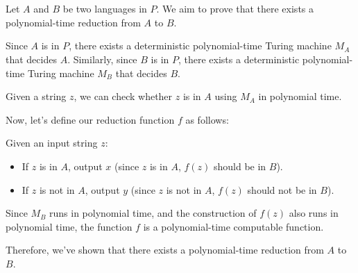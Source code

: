 \documentclass{article}
\begin{document}
\section{}
\begin{latin}
Let $A$ and $B$ be two languages in $P$. We aim to prove that there exists a polynomial-time reduction from $A$ to $B$. 

Since $A$ is in $P$, there exists a deterministic polynomial-time Turing machine $M_A$ that decides $A$. Similarly, since $B$ is in $P$, there exists a deterministic polynomial-time Turing machine $M_B$ that decides $B$.

Given a string $z$, we can check whether $z$ is in $A$ using $M_A$ in polynomial time.

Now, let's define our reduction function $f$ as follows:

Given an input string $z$:
\begin{itemize}
    \item If $z$ is in $A$, output $x$ (since $z$ is in $A$, $f(z)$ should be in $B$).
    \item If $z$ is not in $A$, output $y$ (since $z$ is not in $A$, $f(z)$ should not be in $B$).
\end{itemize}

Since $M_B$ runs in polynomial time, and the construction of $f(z)$ also runs in polynomial time, the function $f$ is a polynomial-time computable function.

Therefore, we've shown that there exists a polynomial-time reduction from $A$ to $B$.
\end{latin}


\section{}
\end{document}

